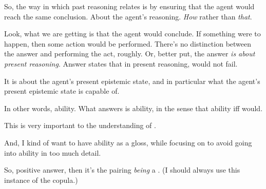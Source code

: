 \begin{note}
  So, the way in which past reasoning relates is by ensuring that the agent would reach the same conclusion.
  About the agent's reasoning.
  \emph{How} rather than \emph{that}.

  Look, what we are getting is that the agent would conclude.
  If something were to happen, then some action would be performed.
  There's no distinction between the answer and performing the act, roughly.
  Or, better put, the answer \emph{is about present reasoning}.
  Answer states that in present reasoning, would not fail.


  It is about the agent's present epistemic state, and in particular what the agent's present epistemic state is capable of.

  In other words, ability.
  What answers is ability, in the sense that ability iff would.

  This is very important to the understanding of \fc{}.

  And, I kind of want to have ability as a gloss, while focusing on \fc{} to avoid going into ability in too much detail.

  So, positive answer, then it's the pairing \emph{being} a \fc{}.
  (I should always use this instance of the copula.)
\end{note}


